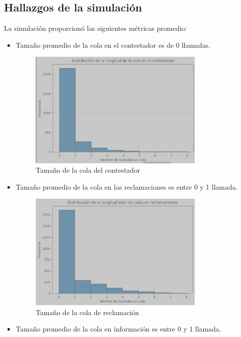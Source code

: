 \documentclass[12pt]{article}
\begin{document}
\subsection{Hallazgos de la simulación}
La simulación proporcionó las siguientes métricas promedio:
\begin{itemize}
    \item Tamaño promedio de la cola en el contestador es de 0 llamadas.
    \begin{figure}[H]
        \centering
        \includegraphics[width=0.8\textwidth]{Answ_queue.png}
        \caption{Tamaño de la cola del contestador}
        \label{fig: Tamaño de la cola del contestador}
    \end{figure}
    \item Tamaño promedio de la cola en las reclamaciones es entre 0 y 1 llamada.
    \begin{figure}[H]
        \centering
        \includegraphics[width=0.8\textwidth]{claim_queue.png}
        \caption{Tamaño de la cola de reclamación}
        \label{fig: Tamaño de la cola de reclamación}
    \end{figure}
    \item Tamaño promedio de la cola en información es entre 0 y 1 llamada.

\end{itemize}
\end{document}
